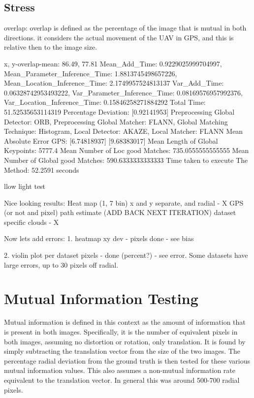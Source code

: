 \subsection*{Stress}

overlap: overlap is defined as the percentage of the image that is mutual in both directions. it considers the actual movement of the UAV in GPS, and this is relative then to the image size. 



x, y-overlap-mean: 86.49, 77.81
Mean_Add_Time: 0.9229025999704997, Mean_Parameter_Inference_Time: 1.8813745498657226, Mean_Location_Inference_Time: 2.1749957524813137
Var_Add_Time: 0.06328742953493222, Var_Parameter_Inference_Time: 0.08169576957992376, Var_Location_Inference_Time: 0.15846258271884292
Total Time: 51.52535653114319
Percentage Deviation: [0.92141953] %
Preprocessing Global Detector: ORB, Preprocessing Global Matcher: FLANN, Global Matching Technique: Histogram, Local Detector: AKAZE, Local Matcher: FLANN
Mean Absolute Error GPS: [6.74818937]
[9.68383017]
Mean Length of Global Keypoints: 5777.4
Mean Number of Loc good Matches: 735.0555555555555
Mean Number of Global good Matches: 590.6333333333333
Time taken to execute The Method: 52.2591 seconds

llow light test



Nice looking results:
Heat map (1, 7 bin) x and y separate, and radial - X 
GPS (or not and pixel) path estimate (ADD BACK NEXT ITERATION)
dataset specific clouds - X


Now lets add errors:
1. heatmap xy dev - pixels done - see bias


2. violin plot per dataset pixels - done (percent?) - see error. Some datasets have large errors, up to 30 pixels off radial.




\section{Mutual Information Testing}
Mutual information is defined in this context as the amount of information that is present in both images. Specifically, it is the number of equivalent pixels in both images, assuming no distortion or rotation, only translation. It is found by simply subtracting the translation vector from the size of the two images. The percentage radial deviation from the ground truth is then tested for these various mutual information values. This also assumes a non-mutual information rate equivalent to the translation vector. In general this was around 500-700 radial pixels. 

